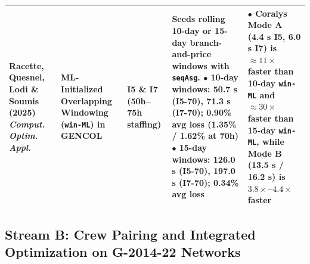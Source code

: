 \documentclass[journal]{IEEEtran}
\begin{document}
\begin{table}[t]
{\begin{tabular}{p{3.2cm}p{3.0cm}p{2.0cm}p{5.6cm}p{5.6cm}}
\midrule
Racette, Quesnel, Lodi \& Soumis (2025) \cite{racette2025} \newline \emph{Comput. Optim. Appl.} & ML-Initialized Overlapping Windowing (\texttt{win-ML}) in GENCOL & I5 \& I7 (50h--75h staffing) & Seeds rolling 10-day or 15-day branch-and-price windows with \texttt{seqAsg}. \newline $\bullet$ 10-day windows: 50.7 s (I5-70), 71.3 s (I7-70); 0.90\% avg loss (1.35\% / 1.62\% at 70h) \newline $\bullet$ 15-day windows: 126.0 s (I5-70), 197.0 s (I7-70); 0.34\% avg loss & $\bullet$ Coralys Mode A (4.4 s I5, 6.0 s I7) is $\approx 11\times$ faster than 10-day \texttt{win-ML} and $\approx 30\times$ faster than 15-day \texttt{win-ML}, while Mode B (13.5 s / 16.2 s) is $3.8\times$--$4.4\times$ faster \\
\bottomrule
\end{tabular}%
}
\end{table}

\subsection{Stream B: Crew Pairing and Integrated Optimization on G-2014-22 Networks}
\label{sec:stream_b}
\end{document}
